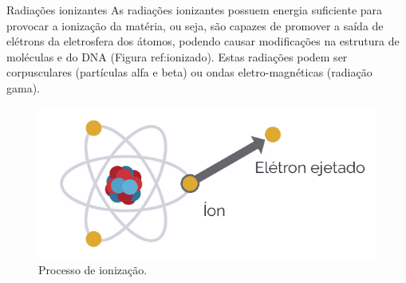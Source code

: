 \documentclass[presentation,professionalfonts,aspectratio=169]{beamer}
\begin{document}
\begin{frame}[label={sec:org820ecae}]{Radiações ionizantes}
As radiações ionizantes possuem energia suficiente para provocar a ionização da matéria, ou seja, são capazes de promover a saída de elétrons da eletrosfera dos átomos, podendo causar modificações na estrutura de moléculas e do DNA (Figura ref:ionizado). Estas radiações podem ser corpusculares (partículas alfa e beta) ou ondas eletro-magnéticas (radiação gama).

\begin{figure}[htbp]
\centering
\includegraphics[scale=0.3]{FQ/Radioatividade/ionizado.png}
\caption{\label{fig:org76112fa}Processo de ionização.}
\end{figure}
\end{frame}
\end{document}
